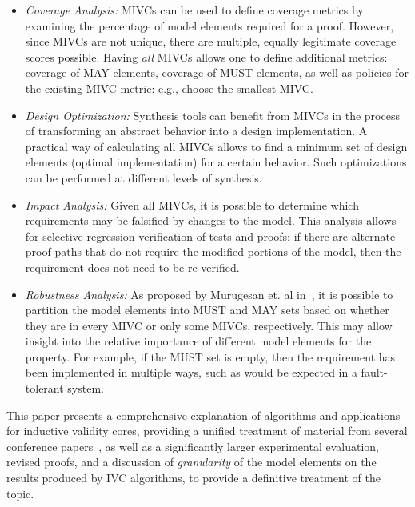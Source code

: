 \begin{itemize}
\item \emph{Coverage Analysis:} MIVCs can be used to define coverage metrics by examining the percentage of model elements required for a proof.  However, since MIVCs are not unique, there are multiple, equally legitimate coverage scores possible.  Having \emph{all} MIVCs allows one to define additional metrics: coverage of MAY elements, coverage of MUST elements, as well as policies for the existing MIVC metric: e.g., choose the smallest MIVC. %

\item \emph{Design Optimization:} Synthesis tools can benefit from MIVCs in the process of transforming an abstract behavior into a design implementation. A practical way of calculating all MIVCs allows to find a minimum set of design elements (optimal implementation) for a certain behavior. Such optimizations can be performed at different levels of synthesis.

\item \emph{Impact Analysis:} Given all MIVCs, it is possible to determine which requirements may be falsified by changes to the model.  This analysis allows for selective regression verification of tests and proofs: if there are alternate proof paths that do not require the modified portions of the model, then the requirement does not need to be re-verified.

\item \emph{Robustness Analysis:} As proposed by Murugesan et. al in~\cite{Murugesan16:renext}, it is possible to partition the model elements into MUST and MAY sets based on whether they are in every MIVC or only some MIVCs, respectively.  This may allow insight into the relative importance of different model elements for the property.  For example, if the MUST set is empty, then the requirement has been implemented in multiple ways, such as would be expected in a fault-tolerant system.
\end{itemize}

This paper presents a comprehensive explanation of algorithms and applications for inductive validity cores, providing a unified treatment of material from several conference papers~\cite{Ghass16,Murugesan16:renext,Ghass17Cov,Ghass17AllIVCs}, as well as a significantly larger experimental evaluation, revised proofs, and a discussion of {\em granularity} of the model elements on the results produced by IVC algorithms, to provide a definitive treatment of the topic.

